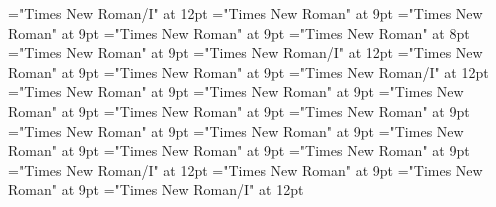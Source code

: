 \documentclass[gps1,twoside]{article}
\begin{document}
\font\sensetypesensesensessensesensessubentrysubentriesentry="Times New Roman/I" at 12pt
\font\abbreviationsensetypesensesensessensesensessubentrysubentriesentrybefore="Times New Roman" at 9pt
\font{}="Times New Roman" at 9pt
\font\spandefinitionorglosssensesensessensesensessubentrysubentriesentrylastchildafter="Times New Roman" at 9pt
\font\exampleexampleexamplessensesensessensesensessubentrysubentriesentrybefore="Times New Roman" at 8pt
\font\examplessensesensessensesensessubentrysubentriesentryafter="Times New Roman" at 9pt
\font\spanbzhexampleexampleexamplessensesensessensesensessubentrysubentriesentry="Times New Roman/I" at 12pt
\font\exampleexampleexamplessensesensessensesensessubentrysubentriesentrybefore="Times New Roman" at 9pt
\font\spanexampleexampleexamplessensesensessensesensessubentrysubentriesentrylastchildafter="Times New Roman" at 9pt
\font\spanexampleexampleexamplessensesensessensesensessubentrysubentriesentry="Times New Roman/I" at 12pt
\font\translationtranslationtranslationsexampleexamplessensesensessensesensessubentrysubentriesentrybefore="Times New Roman" at 9pt
\font\spantranslationtranslationtranslationsexampleexamplessensesensessensesensessubentrysubentriesentrylastchildafter="Times New Roman" at 9pt
\font\encyclopedicinfosensesensessensesensessubentrysubentriesentrybefore="Times New Roman" at 9pt
\font\spanencyclopedicinfosensesensessensesensessubentrysubentriesentryfirstchildbefore="Times New Roman" at 9pt
\font\spanencyclopedicinfosensesensessensesensessubentrysubentriesentrylastchildafter="Times New Roman" at 9pt
\font\restrictionssensesensessensesensessubentrysubentriesentrybefore="Times New Roman" at 9pt
\font\spanrestrictionssensesensessensesensessubentrysubentriesentryfirstchildbefore="Times New Roman" at 9pt
\font\spanrestrictionssensesensessensesensessubentrysubentriesentrylastchildafter="Times New Roman" at 9pt
\font\lexsensereferencessensesensessensesensessubentrysubentriesentrybefore="Times New Roman" at 9pt
\font\lexsensereferencessensesensessensesensessubentrysubentriesentryafter="Times New Roman" at 9pt
\font\spanenownertypeabbreviationlexsensereferencelexsensereferencessensesensessensesensessubentrysubentriesentry="Times New Roman/I" at 12pt
\font\ownertypeabbreviationlexsensereferencelexsensereferencessensesensessensesensessubentrysubentriesentrybefore="Times New Roman" at 9pt
\font\spanownertypeabbreviationlexsensereferencelexsensereferencessensesensessensesensessubentrysubentriesentrylastchildafter="Times New Roman" at 9pt
\font\spanownertypeabbreviationlexsensereferencelexsensereferencessensesensessensesensessubentrysubentriesentry="Times New Roman/I" at 12pt
\end{document}
